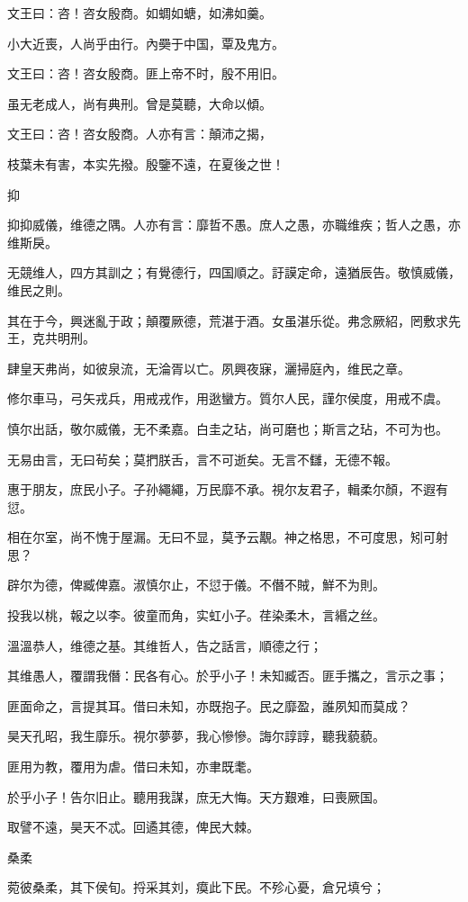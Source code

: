 文王曰：咨！咨女殷商。如蜩如螗，如沸如羹。

小大近喪，人尚乎由行。內奰于中国，覃及鬼方。

文王曰：咨！咨女殷商。匪上帝不时，殷不用旧。

虽无老成人，尚有典刑。曾是莫聽，大命以傾。

文王曰：咨！咨女殷商。人亦有言：顛沛之揭，

枝葉未有害，本实先撥。殷鑒不遠，在夏後之世！

抑

抑抑威儀，维德之隅。人亦有言：靡哲不愚。庶人之愚，亦職维疾；哲人之愚，亦维斯戾。

无競维人，四方其訓之；有覺德行，四国順之。訏謨定命，遠猶辰告。敬慎威儀，维民之則。

其在于今，興迷亂于政；顛覆厥德，荒湛于酒。女虽湛乐從。弗念厥紹，罔敷求先王，克共明刑。

肆皇天弗尚，如彼泉流，无淪胥以亡。夙興夜寐，灑掃庭內，维民之章。

修尔車马，弓矢戎兵，用戒戎作，用逖蠻方。質尔人民，謹尔侯度，用戒不虞。

慎尔出話，敬尔威儀，无不柔嘉。白圭之玷，尚可磨也；斯言之玷，不可为也。

无易由言，无曰茍矣；莫捫朕舌，言不可逝矣。无言不讎，无德不報。

惠于朋友，庶民小子。子孙繩繩，万民靡不承。視尔友君子，輯柔尔顏，不遐有愆。

相在尔室，尚不愧于屋漏。无曰不显，莫予云覯。神之格思，不可度思，矧可射思？

辟尔为德，俾臧俾嘉。淑慎尔止，不愆于儀。不僭不賊，鮮不为則。

投我以桃，報之以李。彼童而角，实虹小子。荏染柔木，言緡之丝。

溫溫恭人，维德之基。其维哲人，告之話言，順德之行；

其维愚人，覆謂我僭：民各有心。於乎小子！未知臧否。匪手攜之，言示之事；

匪面命之，言提其耳。借曰未知，亦既抱子。民之靡盈，誰夙知而莫成？

昊天孔昭，我生靡乐。視尔夢夢，我心慘慘。誨尔諄諄，聽我藐藐。

匪用为教，覆用为虐。借曰未知，亦聿既耄。

於乎小子！告尔旧止。聽用我謀，庶无大悔。天方艱难，曰喪厥国。

取譬不遠，昊天不忒。回遹其德，俾民大棘。

桑柔

菀彼桑柔，其下侯旬。捋采其刘，瘼此下民。不殄心憂，倉兄填兮；

